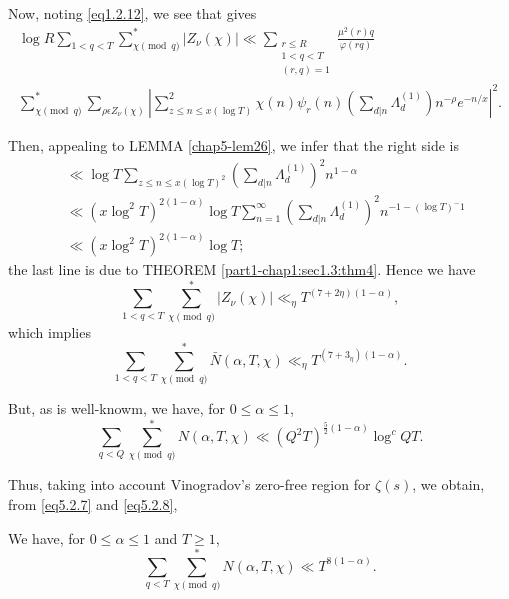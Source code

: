  Now, noting \eqref{eq1.2.12}, we see that gives 
\begin{multline*}
  \log R \sum_{1< q<
    T} \sum^*_{\chi \pmod{q}} |Z_\nu (\chi)| 
  \ll \sum_{\substack{r \leq R\\ 1< q< T\\ (r,q)=1}} \frac{\mu^2 (r)
    q}{\varphi (rq)}\\ 
  \sum^*_{\chi \pmod{q}} \sum_{\rho \epsilon 
    Z_\nu (\chi)} | \sum_{z \leq n \leq x (\log T)}^2 \chi (n)\psi_r
  (n) \left(\sum_{d |n} \Lambda_d^{(1)}\right) n^{-\rho} e^{-n/x}|^2. 
\end{multline*}

Then, appealing to LEMMA \ref{chap5-lem26}, we infer that the right side is 
\begin{align*}
  & \ll \log T \sum_{z \leq n \leq x (\log T)^2} \left(\sum_{d |n}
    \Lambda_d^{(1)}\right)^2 n^{1-\alpha}\\ 
    & \ll (x \log^2 T)^{2 (1-\alpha)} \log T \sum_{n=1}^{\infty}
    \left(\sum_{d|n} \Lambda_d^{(1)}\right)^2 n ^{-1-(\log T)^-1}\\ 
    & \ll (x \log^2 T)^{2 (1-\alpha)} \log T ; 
  \end{align*}  
  the last line is due to THEOREM \ref{part1-chap1:sec1.3:thm4}. Hence
  we have 
  $$
  \sum_{1< q< T} \sum^*_{\chi \pmod{q}} |Z_\nu (\chi)| \ll_\eta T^{(7
    + 2\eta)(1-\alpha)}, 
  $$
  which implies
  \begin{equation*}
    \sum_{1< q< T} \sum^*_{\chi \pmod{q}} \bar{N}(\alpha, T, \chi)
    \ll_\eta T^{(7+3_\eta)(1-\alpha)}. \tag{5.2.7}\label{eq5.2.7} 
  \end{equation*}  
  
  But, as is well-knowm, we have, for $0 \leq \alpha \leq 1$,
  \begin{equation*}
    \sum_{q <Q} \sum^*_{\chi \pmod{q}} N (\alpha, T, \chi) \ll (Q^2
    T)^{\frac{5}{2}(1-\alpha)} \log^c QT. \tag{5.2.8} \label{eq5.2.8}
  \end{equation*}\pageoriginale  
  
  Thus, taking into account Vinogradov's zero-free region for $\zeta
  (s)$, we obtain, from \eqref{eq5.2.7} and \eqref{eq5.2.8}, 
  
\begin{theorem}\label{chap5-thm15}
  We have, for $0 \leq \alpha \leq 1$ and $T\geq 1$,
  $$
  \sum_{q < T} \sum^*_{\chi \pmod{q}} N (\alpha, T, \chi  ) \ll T^{8 (1 - \alpha)}.
  $$
\end{theorem}   

